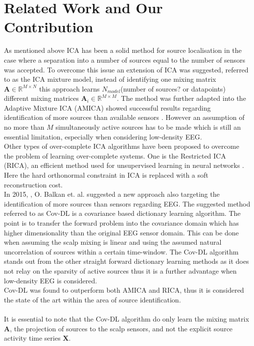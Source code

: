 \section{Related Work and Our Contribution} 
As mentioned above ICA has been a solid method for source localisation in the case where a separation into a number of sources equal to the number of sensors was accepted. To overcome this issue an extension of ICA was suggested, referred to as the ICA mixture model, instead of identifying one mixing matrix $\mathbf{A}\in \mathbb{R}^{M\times N}$ this approach learns $N_{model}$(number of sources? or datapoints) different mixing matrices $\mathbf{A}_i\in \mathbb{R}^{M\times M}$. The method was further adapted into the Adaptive Mixture ICA (AMICA) showed successful results regarding identification of more sources than available sensors \cite{Palmer2008}. However an assumption of no more than $M$ simultaneously active sources has to be made which is still an essential limitation, especially when considering low-density EEG. 
\\
Other types of over-complete ICA algorithms have been proposed to overcome the problem of learning over-complete systems. One is the Restricted ICA (RICA), an efficient method used for unsupervised learning in neural networks \cite{Le2011}. Here the hard orthonormal constraint in ICA is replaced with a soft reconstruction cost.
\\
In 2015, \cite{Balkan2015}, O. Balkan et. al. suggested a new approach also targeting the identification of more sources than sensors regarding EEG. The suggested method referred to as Cov-DL is a covariance based dictionary learning algorithm. The point is to transfer the forward problem into the covariance domain which has higher dimensionality than the original EEG sensor domain. This can be done when assuming the scalp mixing is linear and using the assumed natural uncorrelation of sources within a certain time-window. The Cov-DL algorithm stands out from the other straight forward dictionary learning methods as it does not relay on the sparsity of active sources thus it is a further advantage when low-density EEG is considered. 
\\
Cov-DL was found to outperform both AMICA and RICA, thus it is considered the state of the art within the area of source identification. 
\\ 
\\
It is essential to note that the Cov-DL algorithm do only learn the mixing matrix $\textbf{A}$, the projection of sources to the scalp sensors, and not the explicit source activity time series $\textbf{X}$.
